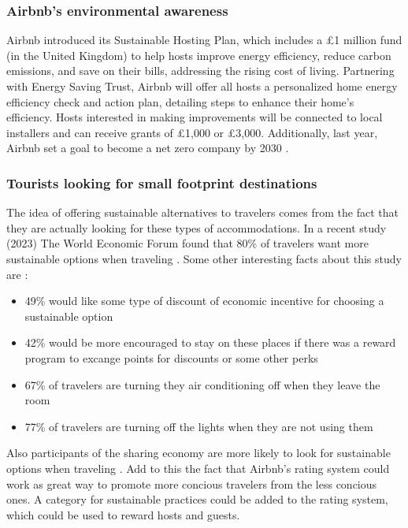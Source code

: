 \documentclass[12pt]{extarticle}
\begin{document}
\subsubsection{Airbnb's environmental awareness}

Airbnb introduced its Sustainable Hosting Plan, which includes a £1 million fund (in the United Kingdom) to help hosts improve energy efficiency, reduce carbon emissions, and save on their bills, 
addressing the rising cost of living. Partnering with Energy Saving Trust, Airbnb will offer all hosts a personalized home energy efficiency check and action plan, detailing steps to
enhance their home's efficiency. Hosts interested in making improvements will be connected to local installers and can receive grants of £1,000 or £3,000. Additionally, last year, 
Airbnb set a goal to become a net zero company by 2030 \cite{Airbnb2022}.

\subsubsection{Tourists looking for small footprint destinations}

The idea of offering sustainable alternatives to travelers comes from the fact that they are actually looking for these types of accommodations. In a recent study (2023) The World 
Economic Forum found that 80\% of travelers want more sustainable options when traveling \cite{SustainableTravelReport2023}. Some other interesting facts about this study are 
\cite{SustainableTravelReport2023}:

\begin{itemize}
    \item 49\% would like some type of discount of economic incentive for choosing a sustainable option
    \item 42\% would be more encouraged to stay on these places if there was a reward program to excange points for discounts or some other perks
    \item 67\% of travelers are turning they air conditioning off when they leave the room
    \item 77\% of travelers are turning off the lights when they are not using them
\end{itemize}

Also participants of the sharing economy are more likely to look for sustainable options when traveling \cite{Webb2014}. Add to this the fact that Airbnb's rating system could work as
great way to promote more concious travelers from the less concious ones. A category for sustainable practices could be added to the rating system, which could be used to reward hosts 
and guests.
\end{document}
